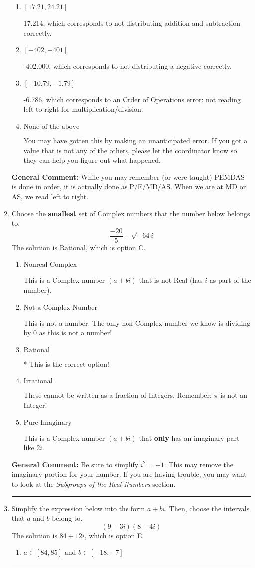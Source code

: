 \documentclass{extbook}[14pt]
\newcommand{\litem}[1]{\item #1

\rule{\textwidth}{0.4pt}}
\begin{document}
\begin{enumerate}
{\begin{enumerate}[label=\Alph*.]
* -44.500, which is the correct option.
\item \( [17.21, 24.21] \)

 17.214, which corresponds to not distributing addition and subtraction correctly.
\item \( [-402, -401] \)

 -402.000, which corresponds to not distributing a negative correctly.
\item \( [-10.79, -1.79] \)

 -6.786, which corresponds to an Order of Operations error: not reading left-to-right for multiplication/division.
\item \( \text{None of the above} \)

 You may have gotten this by making an unanticipated error. If you got a value that is not any of the others, please let the coordinator know so they can help you figure out what happened.
\end{enumerate}

\textbf{General Comment:} While you may remember (or were taught) PEMDAS is done in order, it is actually done as P/E/MD/AS. When we are at MD or AS, we read left to right.
}
\litem{
Choose the \textbf{smallest} set of Complex numbers that the number below belongs to.
\[ \frac{-20}{5}+\sqrt{-64}i \]The solution is \( \text{Rational} \), which is option C.\begin{enumerate}[label=\Alph*.]
\item \( \text{Nonreal Complex} \)

This is a Complex number $(a+bi)$ that is not Real (has $i$ as part of the number).
\item \( \text{Not a Complex Number} \)

This is not a number. The only non-Complex number we know is dividing by 0 as this is not a number!
\item \( \text{Rational} \)

* This is the correct option!
\item \( \text{Irrational} \)

These cannot be written as a fraction of Integers. Remember: $\pi$ is not an Integer!
\item \( \text{Pure Imaginary} \)

This is a Complex number $(a+bi)$ that \textbf{only} has an imaginary part like $2i$.
\end{enumerate}

\textbf{General Comment:} Be sure to simplify $i^2 = -1$. This may remove the imaginary portion for your number. If you are having trouble, you may want to look at the \textit{Subgroups of the Real Numbers} section.
}
\litem{
Simplify the expression below into the form $a+bi$. Then, choose the intervals that $a$ and $b$ belong to.
\[ (9 - 3 i)(8 + 4 i) \]The solution is \( 84 + 12 i \), which is option E.\begin{enumerate}[label=\Alph*.]
\item \( a \in [84, 85] \text{ and } b \in [-18, -7] \)


\end{enumerate}}
\end{enumerate}
\end{document}
